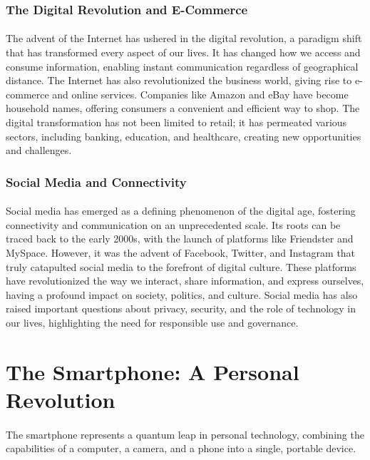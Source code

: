 \documentclass[a4paper,12pt]{book}
\begin{document}
\subsubsection*{The Digital Revolution and E-Commerce}
\paragraph{}
The advent of the Internet has ushered in the digital revolution, a paradigm shift that has transformed every aspect of our lives. It has changed how we access and consume information, enabling instant communication regardless of geographical distance. The Internet has also revolutionized the business world, giving rise to e-commerce and online services. Companies like Amazon and eBay have become household names, offering consumers a convenient and efficient way to shop. The digital transformation has not been limited to retail; it has permeated various sectors, including banking, education, and healthcare, creating new opportunities and challenges.

\subsubsection*{Social Media and Connectivity}
\paragraph{}
Social media has emerged as a defining phenomenon of the digital age, fostering connectivity and communication on an unprecedented scale. Its roots can be traced back to the early 2000s, with the launch of platforms like Friendster and MySpace. However, it was the advent of Facebook, Twitter, and Instagram that truly catapulted social media to the forefront of digital culture. These platforms have revolutionized the way we interact, share information, and express ourselves, having a profound impact on society, politics, and culture. Social media has also raised important questions about privacy, security, and the role of technology in our lives, highlighting the need for responsible use and governance.

\section*{The Smartphone: A Personal Revolution}
\paragraph{}
The smartphone represents a quantum leap in personal technology, combining the capabilities of a computer, a camera, and a phone into a single, portable device.
\end{document}
